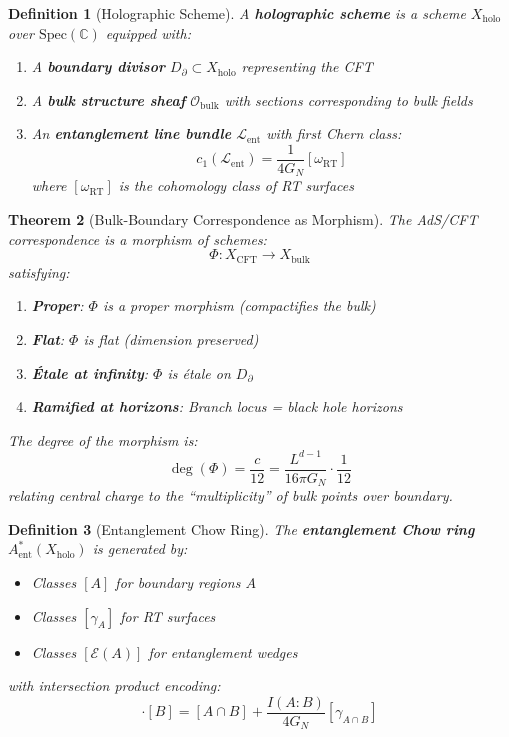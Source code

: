 \documentclass[12pt,a4paper]{article}
\newtheorem{theorem}{Theorem}[section]
\newtheorem{definition}[theorem]{Definition}
\begin{document}
\begin{definition}[Holographic Scheme]\label{def:holo-scheme}
A \textbf{holographic scheme} is a scheme $X_{\text{holo}}$ over $\text{Spec}(\mathbb{C})$ equipped with:
\begin{enumerate}
    \item A \textbf{boundary divisor} $D_\partial \subset X_{\text{holo}}$ representing the CFT
    \item A \textbf{bulk structure sheaf} $\mathcal{O}_{\text{bulk}}$ with sections corresponding to bulk fields
    \item An \textbf{entanglement line bundle} $\mathcal{L}_{\text{ent}}$ with first Chern class:
    \begin{equation}
    c_1(\mathcal{L}_{\text{ent}}) = \frac{1}{4G_N} [\omega_{\text{RT}}]
    \end{equation}
    where $[\omega_{\text{RT}}]$ is the cohomology class of RT surfaces
\end{enumerate}
\end{definition}

\begin{theorem}[Bulk-Boundary Correspondence as Morphism]\label{thm:bulk-boundary-morphism}
The AdS/CFT correspondence is a morphism of schemes:
\begin{equation}
\Phi: X_{\text{CFT}} \to X_{\text{bulk}}
\end{equation}
satisfying:
\begin{enumerate}
    \item \textbf{Proper}: $\Phi$ is a proper morphism (compactifies the bulk)
    \item \textbf{Flat}: $\Phi$ is flat (dimension preserved)
    \item \textbf{\'Etale at infinity}: $\Phi$ is \'etale on $D_\partial$
    \item \textbf{Ramified at horizons}: Branch locus = black hole horizons
\end{enumerate}

The degree of the morphism is:
\begin{equation}
\deg(\Phi) = \frac{c}{12} = \frac{L^{d-1}}{16\pi G_N} \cdot \frac{1}{12}
\end{equation}
relating central charge to the ``multiplicity'' of bulk points over boundary.
\end{theorem}

\begin{definition}[Entanglement Chow Ring]\label{def:ent-chow}
The \textbf{entanglement Chow ring} $A^*_{\text{ent}}(X_{\text{holo}})$ is generated by:
\begin{itemize}
    \item Classes $[A]$ for boundary regions $A$
    \item Classes $[\gamma_A]$ for RT surfaces
    \item Classes $[\mathcal{E}(A)]$ for entanglement wedges
\end{itemize}
with intersection product encoding:
\begin{equation}
[A] \cdot [B] = [A \cap B] + \frac{I(A:B)}{4G_N} [\gamma_{A \cap B}]
\end{equation}
\end{definition}
\end{document}

